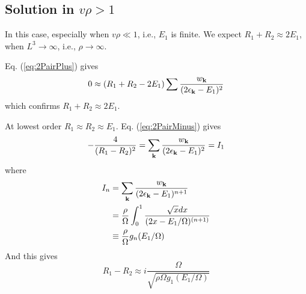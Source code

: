 \documentclass[aps,prb,showpacs,reprint]{revtex4-1}
\begin{document}
\subsection{Solution in $v\rho>1$}
In this case, especially when $v\rho\ll1$, i.e., $E_1$ is finite. We expect $R_1+R_2\approx2E_1$, when $L^3\rightarrow\infty$, i.e., $\rho\rightarrow\infty$.  

Eq. (\ref{eq:2PairPlus}) gives 
\begin{equation*}
0\approx(R_1+R_2-2E_1)\sum\frac{w_{\mathbf{k}}}{(2\epsilon_{\mathbf{k}}-E_1)^2}
\label{eq:}
\end{equation*}
which confirms  $R_1+R_2\approx2E_1$.

At lowest order $R_1\approx{}R_2\approx{}E_1$.  Eq. (\ref{eq:2PairMinus}) gives 
\begin{equation}
-\frac{4}{(R_1-R_2)^2}=\sum_{\mathbf{k}}\frac{w_{\mathbf{k}}}{(2\epsilon_{\mathbf{k}}-E_1)^2}=I_1
\label{eq:}
\end{equation}
where 
\begin{equation}
\begin{split}
I_n&=\sum_{\mathbf{k}}\frac{w_{\mathbf{k}}}{(2\epsilon_{\mathbf{k}}-E_1)^{n+1}}\\
	&=\frac{\rho}{\Omega}\int^1_0\frac{\sqrt{x}dx}{(2x-E_1/\Omega)^{(n+1)}}\\
	&\equiv\frac{\rho}{\Omega}g_n(E_1/\Omega)
\end{split}
\label{eq:}
\end{equation}
And this gives 
\begin{equation}
R_1-R_2\approx{}i\frac{\Omega}{\sqrt{\rho\Omega{}g_1(E_1/\Omega)}}
\label{eq:}
\end{equation}
\end{document}
